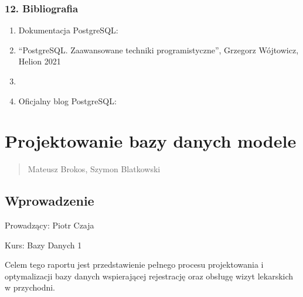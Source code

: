 \documentclass[a4paper,11pt,openany,english]{sphinxmanual}
\begin{document}
\subsection{12. Bibliografia}
\label{\detokenize{rozdzial2/Partycjonowanie-danych/source/Partycjonowanie:bibliografia}}\begin{enumerate}
%
\item {} 
\sphinxAtStartPar
Dokumentacja PostgreSQL: 

\item {} 
\sphinxAtStartPar
“PostgreSQL. Zaawansowane techniki programistyczne”, Grzegorz Wójtowicz, Helion 2021

\item {} 
\sphinxAtStartPar
{}

\item {} 
\sphinxAtStartPar
Oficjalny blog PostgreSQL: 

\end{enumerate}

\sphinxstepscope


\chapter{Projektowanie bazy danych \sphinxhyphen{} modele}
\label{\detokenize{rozdzial3/index:projektowanie-bazy-danych-modele}}\label{\detokenize{rozdzial3/index::doc}}\begin{quote}\begin{description}
\sphinxAtStartPar
Mateusz Brokos, Szymon Blatkowski

\end{description}\end{quote}


\section{Wprowadzenie}
\label{\detokenize{rozdzial3/index:wprowadzenie}}
\sphinxAtStartPar
Prowadzący: Piotr Czaja

\sphinxAtStartPar
Kurs: Bazy Danych 1

\sphinxAtStartPar
Celem tego raportu jest przedstawienie pełnego procesu projektowania i optymalizacji bazy danych wspierającej rejestrację oraz obsługę wizyt lekarskich w przychodni.
\end{document}
